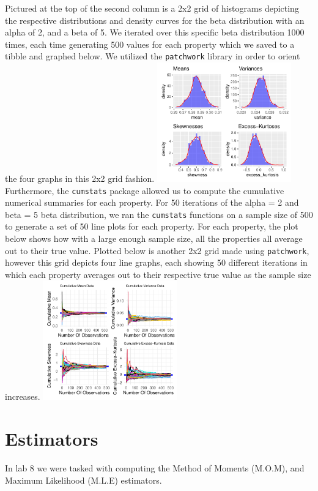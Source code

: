 \documentclass{article}\usepackage[]{graphicx}\usepackage[]{xcolor}
\begin{document}
\begin{multicols}{2}
Pictured at the top of the second column is a 2x2 grid of histograms depicting the respective distributions and density curves for the beta distribution with an alpha of 2, and a beta of 5. We iterated over this specific beta distribution 1000 times, each time generating 500 values for each property which we saved to a tibble and graphed below. We utilized the \texttt{patchwork} \citep{patchwork} library in order to orient the four graphs in this 2x2 grid fashion.
\includegraphics[width=0.435\textwidth]{2x2Plot.pdf}
\newline \newline \indent 
Furthermore, the  \texttt{cumstats} \citep{cumstats} package allowed us to compute the cumulative numerical summaries for each property. For 50 iterations of the alpha = 2 and beta = 5 beta distribution, we ran the \texttt{cumstats} functions on a sample size of 500 to generate a set of 50 line plots for each property. For each property, the plot below shows how with a large enough sample size, all the properties all average out to their true value. Plotted below is another 2x2 grid made using \texttt{patchwork}, however this grid depicts four line graphs, each showing 50 different iterations in which each property averages out to their respective true value as the sample size increases. 
\includegraphics[width=0.435\textwidth]{2x2Grid2.pdf}
\section{Estimators}
In lab 8 we were tasked with computing the Method of Moments (M.O.M), and Maximum Likelihood (M.L.E) estimators.



\end{multicols}
\end{document}

